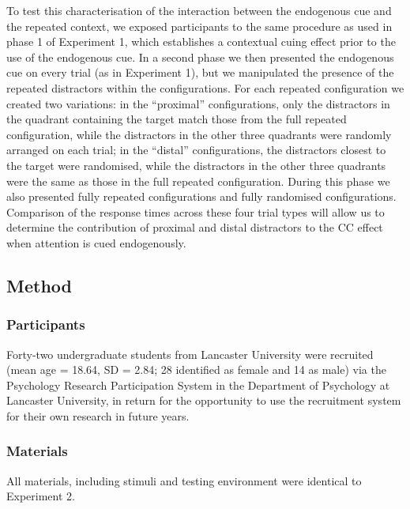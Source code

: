 \documentclass[
  man,floatsintext]{apa7}
\begin{document}
To test this characterisation of the interaction between the endogenous cue and the repeated context, we exposed participants to the same procedure as used in phase 1 of Experiment 1, which establishes a contextual cuing effect prior to the use of the endogenous cue. In a second phase we then presented the endogenous cue on every trial (as in Experiment 1), but we manipulated the presence of the repeated distractors within the configurations. For each repeated configuration we created two variations: in the ``proximal'' configurations, only the distractors in the quadrant containing the target match those from the full repeated configuration, while the distractors in the other three quadrants were randomly arranged on each trial; in the ``distal'' configurations, the distractors closest to the target were randomised, while the distractors in the other three quadrants were the same as those in the full repeated configuration. During this phase we also presented fully repeated configurations and fully randomised configurations. Comparison of the response times across these four trial types will allow us to determine the contribution of proximal and distal distractors to the CC effect when attention is cued endogenously.

\hypertarget{method-2}{%
\subsection{Method}\label{method-2}}

\hypertarget{participants-2}{%
\subsubsection{Participants}\label{participants-2}}

Forty-two undergraduate students from Lancaster University were recruited (mean age = 18.64, SD = 2.84; 28 identified as female and 14 as male) via the Psychology Research Participation System in the Department of Psychology at Lancaster University, in return for the opportunity to use the recruitment system for their own research in future years.

\hypertarget{materials-2}{%
\subsubsection{Materials}\label{materials-2}}

All materials, including stimuli and testing environment were identical to Experiment 2.
\end{document}
